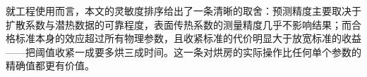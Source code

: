 就工程使用而言，本文的灵敏度排序给出了一条清晰的取舍：预测精度主要取决于扩散系数与潜热数据的可靠程度，表面传热系数的测量精度几乎不影响结果；而合格标准本身的效应超过所有物理参数，且收紧标准的代价明显大于放宽标准的收益——把阈值收紧一成要多烘三成时间。这一条对烘房的实际操作比任何单个参数的精确值都更有价值。

